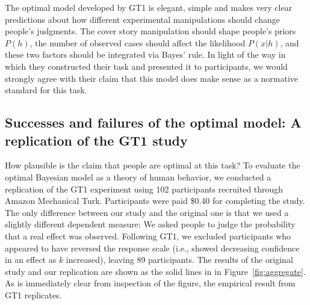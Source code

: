 \documentclass[doc,floatsintext]{apa6}
\begin{document}
The optimal model developed by GT1 is elegant, simple and makes very clear predictions about how different experimental manipulations should change people's judgments. The cover story manipulation should shape people's priors $P(h)$, the number of observed cases should affect the likelihood $P(x|h)$, and these two factors should be integrated via Bayes' rule. In light of the way in which they constructed their task and presented it to participants, we would strongly agree with their claim that this model does make sense as a normative standard for this task.

\subsection*{Successes and failures of the optimal model: A replication of the GT1 study}

How plausible is the claim that people are optimal at this task? To evaluate the optimal Bayesian model as a theory of human behavior, we conducted a replication of the GT1 experiment using 102 participants recruited through Amazon Mechanical Turk. Participants were paid \$0.40 for completing the study. The only difference between our study and the original one is that we used a slightly different dependent measure: We asked people to judge the probability that a real effect was observed. Following GT1, we excluded participants who appeared to have reversed the response scale (i.e., showed decreasing confidence in an effect as $k$ increased), leaving 89 participants. The results of the original study and our replication are shown as the solid lines in in Figure~\ref{fig:aggregate}. As is immediately clear from inspection of the figure, the empirical result from GT1 replicates.
\end{document}
